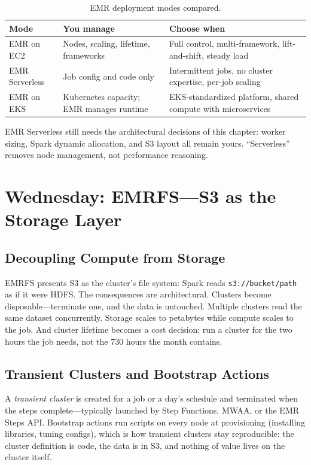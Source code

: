 \begin{table}[H]
\centering
\small
\begin{tabular}{@{}p{3.0cm}p{4.2cm}p{5.0cm}@{}}
\toprule
\textbf{Mode} & \textbf{You manage} & \textbf{Choose when} \\
\midrule
EMR on EC2 & Nodes, scaling, lifetime, frameworks & Full control, multi-framework, lift-and-shift, steady load \\
EMR Serverless & Job config and code only & Intermittent jobs, no cluster expertise, per-job scaling \\
EMR on EKS & Kubernetes capacity; EMR manages runtime & EKS-standardized platform, shared compute with microservices \\
\bottomrule
\end{tabular}
\caption{EMR deployment modes compared.}
\label{tab:ch9-emr-modes}
\end{table}

\begin{notebox}
EMR Serverless still needs the architectural decisions of this chapter: worker sizing, Spark dynamic allocation, and S3 layout all remain yours. ``Serverless'' removes node management, not performance reasoning.
\end{notebox}

\section{Wednesday: EMRFS---S3 as the Storage Layer}
\subsection{Decoupling Compute from Storage}
EMRFS presents S3 as the cluster's file system: Spark reads \texttt{s3://bucket/path} as if it were HDFS. The consequences are architectural. Clusters become disposable---terminate one, and the data is untouched. Multiple clusters read the same dataset concurrently. Storage scales to petabytes while compute scales to the job. And cluster lifetime becomes a cost decision: run a cluster for the two hours the job needs, not the 730 hours the month contains.

\subsection{Transient Clusters and Bootstrap Actions}
A \emph{transient cluster} is created for a job or a day's schedule and terminated when the steps complete---typically launched by Step Functions, MWAA, or the EMR Steps API. Bootstrap actions run scripts on every node at provisioning (installing libraries, tuning configs), which is how transient clusters stay reproducible: the cluster definition is code, the data is in S3, and nothing of value lives on the cluster itself.


